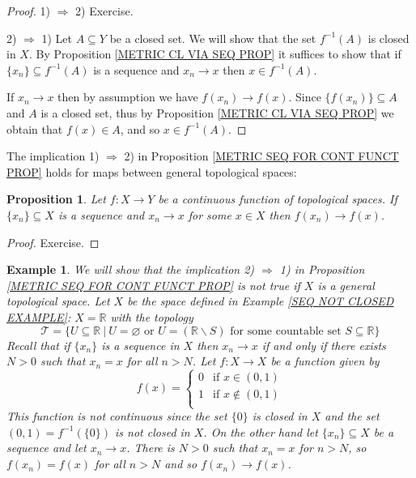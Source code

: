 \documentclass[11pt, letterpaper, oneside]{report}
\theoremstyle{pplain}
\newtheorem{proposition}[theorem]{Proposition}
\newtheorem{ITERMVALUE THM}[theorem]{Intermediate Value Theorem}
\newtheorem{HEINEBOREL THM}[theorem]{Heine-Borel Theorem}
\newtheorem{UMETR THM}[theorem]{Urysohn Metrization Theorem}
\newtheorem{UMETR2 THM}[theorem]{Urysohn Metrization Theorem (v.2)}
\theoremstyle{ddefinition}
\newtheorem{example}[theorem]{Example}
\theoremstyle{nnn}
\newtheorem{TDA NN}[theorem]{Topological Data Analysis. }
\theoremstyle{eexercise}
\newcommand{\Ra}{\Rightarrow}
\newcommand{\R}{{\mathbb R}}
\newcommand{\TT}{{\mathcal T}}
\newcommand{\ssmin}{\smallsetminus}
\begin{document}
\begin{proof}
1) $\Ra$ 2) Exercise. 

2) $\Ra$ 1) Let $A\subseteq Y$ be a closed set. We will show that the set $f^{-1}(A)$
is closed in $X$. By Proposition  \ref{METRIC CL VIA SEQ PROP} it  suffices to show
that if $\{x_{n}\}\subseteq f^{-1}(A)$ is a sequence and $x_{n}\to x$ then $x\in f^{-1}(A)$. 

If  $x_{n}\to x$ then by assumption we have 
$f(x_{n})\to f(x)$. Since $\{f(x_{n})\}\subseteq A$ and $A$
is a closed set, thus by Proposition \ref{METRIC CL VIA SEQ PROP} we obtain that 
$f(x)\in A$, and so  $x\in f^{-1}(A)$. 
\end{proof}

The implication 1) $\Ra$ 2) in Proposition \ref{METRIC SEQ FOR CONT FUNCT PROP} holds for 
maps between general topological spaces:

\begin{proposition}
\label{SEQ FOR CONT FUNCT PROP}
Let $f\colon X\to Y$ be a continuous function of topological spaces. If $\{x_{n}\}\subseteq X$ is a sequence
and $x_{n}\to x$ for some $x\in X$ then $f(x_{n})\to f(x)$. 
\end{proposition}

\begin{proof}
Exercise. 
\end{proof}

\begin{example}
We will show that the implication 2) $\Ra$ 1) in Proposition \ref{METRIC SEQ FOR CONT FUNCT PROP} is not 
true if $X$ is a general  topological space. 
Let  $X$ be the  space defined  in Example \ref{SEQ NOT CLOSED EXAMPLE}: $X= \R$ with the topology
$$\TT = \{U\subseteq \R \ | \ U= \varnothing 
 \text{ or $U= (\R\ssmin S)$ for some countable set $S\subseteq \R$}\}$$
 Recall that if $\{x_{n}\}$ is a sequence in $X$ then $x_{n}\to x$ if and only if there exists $N>0$ such that 
 $x_{n}= x$ for all $n>N$. 
 Let $f\colon X \to X$ be a function  given by 
$$
f(x) = 
\begin{cases}
0 & \text{if }  x\in (0, 1) \\
1 & \text{if } x\not\in (0, 1) \\
\end{cases}
$$
This function is not continuous since the set $\{0\}$ is closed in $X$ and the set 
$(0, 1) = f^{-1}(\{0\})$ is not closed in $X$.  On the other hand let $\{x_{n}\}\subseteq X$
be a sequence and let $x_{n}\to x$. There is  $N>0$ such that $x_{n} = x$ for $n>N$,  so 
$f(x_{n}) = f(x)$ for all $n>N$ and so $f(x_{n})\to f(x)$.  
\end{example}
\end{document}
